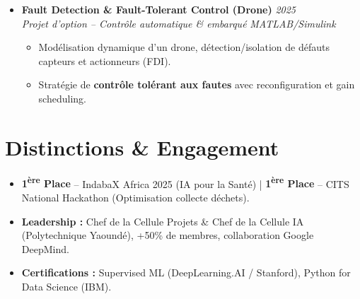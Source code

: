 \documentclass[a4paper,11pt]{article}
\begin{document}
\begin{itemize}[leftmargin=*, label={-}]
\item \textbf{Fault Detection \& Fault-Tolerant Control (Drone)} \hfill \textit{2025} \\
\textit{Projet d'option -- Contrôle automatique \& embarqué} \hfill \textit{MATLAB/Simulink}
\vspace{-2pt}
    \begin{itemize}[leftmargin=0.4cm, nosep, label=\tiny$\bullet$]
        \item \small{Modélisation dynamique d'un drone, détection/isolation de défauts capteurs et actionneurs (FDI).}
        \item \small{Stratégie de \textbf{contrôle tolérant aux fautes} avec reconfiguration et gain scheduling.}
    \end{itemize}
\vspace{3pt}

\end{itemize}

\section{Distinctions \& Engagement}
\begin{itemize}[leftmargin=*, nosep]
    \item \small{\textbf{1\textsuperscript{ère} Place} -- IndabaX Africa 2025 (IA pour la Santé) | \textbf{1\textsuperscript{ère} Place} -- CITS National Hackathon (Optimisation collecte déchets).}
    \item \small{\textbf{Leadership :} Chef de la Cellule Projets \& Chef de la Cellule IA (Polytechnique Yaoundé), +50\% de membres, collaboration Google DeepMind.}
    \item \small{\textbf{Certifications :} Supervised ML (DeepLearning.AI / Stanford), Python for Data Science (IBM).}
\end{itemize}
\end{document}
